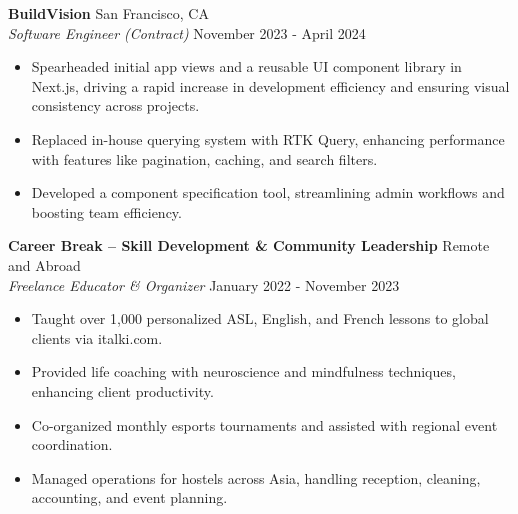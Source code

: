 \documentclass[a4paper]{article}
\begin{document}
\textbf{BuildVision} \hfill San Francisco, CA\\
\textit{Software Engineer (Contract)} \hfill November 2023 - April 2024\\
\vspace{-1mm}
\begin{itemize} \itemsep .5pt
    \item Spearheaded initial app views and a reusable UI component library in Next.js, driving a rapid increase in development efficiency and ensuring visual consistency across projects.
    \item Replaced in-house querying system with RTK Query, enhancing performance with features like pagination, caching, and search filters.
    \item Developed a component specification tool, streamlining admin workflows and boosting team efficiency.
\end{itemize}

\textbf{Career Break – Skill Development \& Community Leadership} \hfill Remote and Abroad\\
\textit{Freelance Educator \& Organizer} \hfill January 2022 - November 2023\\
\vspace{-1mm}
\begin{itemize} \itemsep .5pt
    \item Taught over 1,000 personalized ASL, English, and French lessons to global clients via italki.com.
    \item Provided life coaching with neuroscience and mindfulness techniques, enhancing client productivity.
    \item Co-organized monthly esports tournaments and assisted with regional event coordination.
    \item Managed operations for hostels across Asia, handling reception, cleaning, accounting, and event planning.
\end{itemize}
\end{document}
